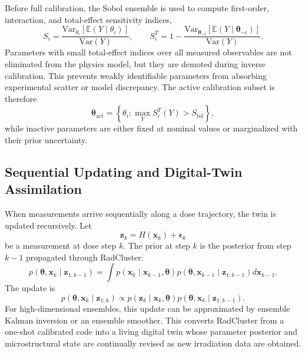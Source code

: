 Before full calibration, the Sobol ensemble is used to compute first-order,
interaction, and total-effect sensitivity indices,
\begin{equation}
    S_i
    =
    \frac{\mathrm{Var}_{\theta_i}
    \left[\mathbb{E}(Y\mid\theta_i)\right]}{\mathrm{Var}(Y)},
    \qquad
    S_i^T
    =
    1-
    \frac{\mathrm{Var}_{\boldsymbol{\theta}_{\sim i}}
    \left[\mathbb{E}(Y\mid\boldsymbol{\theta}_{\sim i})\right]}
    {\mathrm{Var}(Y)} .
\end{equation}
Parameters with small total-effect indices over all measured observables are
not eliminated from the physics model, but they are demoted during inverse
calibration.  This prevents weakly identifiable parameters from absorbing
experimental scatter or model discrepancy.  The active calibration subset is
therefore
\begin{equation}
    \boldsymbol{\theta}_{\mathrm{act}}
    =
    \left\{
      \theta_i:
      \max_Y S_i^T(Y) > S_{\mathrm{tol}}
    \right\},
\end{equation}
while inactive parameters are either fixed at nominal values or marginalized
with their prior uncertainty.

\subsection{Sequential Updating and Digital-Twin Assimilation}
\label{app:dt_sequential_update}

When measurements arrive sequentially along a dose trajectory, the twin is
updated recursively.  Let
\begin{equation}
    \mathbf{z}_k
    =
    H(\mathbf{x}_k)
    +
    \boldsymbol{\epsilon}_k
\end{equation}
be a measurement at dose step $k$.  The prior at step $k$ is the posterior
from step $k-1$ propagated through RadCluster:
\begin{equation}
    p(\boldsymbol{\theta},\mathbf{x}_k\mid\mathbf{z}_{1:k-1})
    =
    \int
    p(\mathbf{x}_k\mid\mathbf{x}_{k-1},\boldsymbol{\theta})
    p(\boldsymbol{\theta},\mathbf{x}_{k-1}\mid\mathbf{z}_{1:k-1})
    d\mathbf{x}_{k-1} .
\end{equation}
The update is
\begin{equation}
    p(\boldsymbol{\theta},\mathbf{x}_k\mid\mathbf{z}_{1:k})
    \propto
    p(\mathbf{z}_k\mid\mathbf{x}_k,\boldsymbol{\theta})
    p(\boldsymbol{\theta},\mathbf{x}_k\mid\mathbf{z}_{1:k-1}) .
\end{equation}
For high-dimensional ensembles, this update can be approximated by ensemble
Kalman inversion or an ensemble smoother.  This converts RadCluster from a
one-shot calibrated code into a living digital twin whose parameter posterior
and microstructural state are continually revised as new irradiation data are
obtained.

